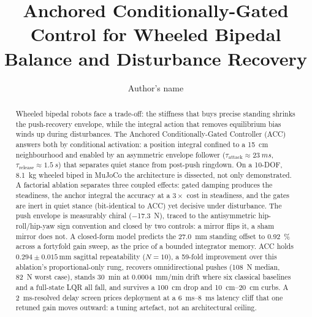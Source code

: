 \documentclass[a4paper,fleqn]{cas-dc}
\begin{document}
\let\WriteBookmarks\relax


\title[mode = title]{Anchored Conditionally-Gated Control for Wheeled Bipedal
Balance and Disturbance Recovery}

\RenewDocumentCommand\printorcid{}{}
\author[1]{Author's name}
\cormark[1]



\begin{abstract}
Wheeled bipedal robots face a trade-off: the stiffness that buys precise
standing shrinks the push-recovery envelope, while the integral action that
removes equilibrium bias winds up during disturbances. The Anchored
Conditionally-Gated Controller (ACC) answers both by conditional activation: a position integral confined to a \SI{15}{cm} neighbourhood and enabled by an
asymmetric envelope follower ($\tau_{\text{attack}}{\approx}\SI{23}{ms}$,
$\tau_{\text{release}}{\approx}\SI{1.5}{s}$) that separates quiet stance from
post-push ringdown. On a \num{10}-DOF, \SI{8.1}{kg} wheeled biped in MuJoCo the
architecture is dissected, not only demonstrated. A factorial ablation separates
three coupled effects: gated damping produces the steadiness, the anchor
integral the accuracy at a $3{\times}$ cost in steadiness, and the gates are inert in quiet stance (bit-identical to ACC) yet decisive under disturbance.
The push envelope is measurably chiral (\SI{-17.3}{N}), traced to the
antisymmetric hip-roll/hip-yaw sign convention and closed by two controls: a
mirror flips it, a sham mirror does not. A
closed-form model predicts the \SI{27.0}{mm} standing offset to
\SI{0.92}{\percent} across a fortyfold gain sweep, as the price of a bounded
integrator memory. ACC holds $0.294{\pm}0.015$\,mm sagittal repeatability ($N{=}10$), a \num{59}-fold improvement over this ablation's proportional-only rung, recovers omnidirectional pushes (\SI{108}{N} median, \SI{82}{N} worst case), stands
\SI{30}{min} at \SI{0.0004}{mm/min} drift where six classical baselines and a
full-state LQR all fall, and survives a \SI{100}{cm} drop and
\SIrange{10}{20}{cm} curbs. A \SI{2}{ms}-resolved delay screen prices deployment
at a \SIrange{6}{8}{ms} latency cliff that one retuned gain moves outward: a
tuning artefact, not an architectural ceiling.
\end{abstract}
\end{document}
